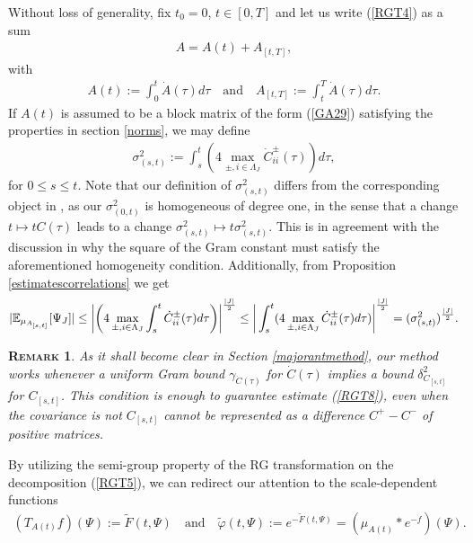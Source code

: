 \documentclass[12pt,twoside]{amsart}
\newcommand{\E}{{\mathbb{E}}}
\newtheorem{rem}{\textsc{Remark}}[section]
\numberwithin{equation}{section}
\begin{document}
Without loss of generality, fix $t_{0} = 0$, $t \in [0,T]$ and let us write (\ref{RGT4}) as a sum
\begin{eqnarray}
A = A(t) + A_{[t,T]}, \label{RGT5}
\end{eqnarray}
with
\begin{eqnarray}
A(t) := \int_{0}^{t}\dot{A}(\tau)d\tau \quad \mbox{and} \quad A_{[t,T]} := \int_{t}^{T}\dot{A}(\tau)d\tau. \label{RGT6}
\end{eqnarray}
If $A(t)$ is assumed to be a block matrix of the form (\ref{GA29}) satisfying the properties in section \ref{norms}, we may define
\begin{eqnarray}
\sigma_{(s,t)}^{2} := \int_{s}^{t}(4\max_{\pm, i \in \Lambda_{J}}\dot{C}_{ii}^{\pm}(\tau))d\tau, \label{RGT7}
\end{eqnarray}
for $0 \le s \le t$. Note that our definition of $\sigma_{(s,t)}^{2}$ differs from the corresponding object in \cite{BryWri}, as our $\sigma_{(0,t)}^{2}$ is homogeneous of degree one, in the sense that a change $t \mapsto t C(\tau)$ leads to a change $\sigma_{(s,t)}^{2} \mapsto t \sigma_{(s,t)}^{2}$. This is in agreement with the discussion in \cite{SW} why the square of the Gram constant must satisfy the aforementioned homogeneity condition. Additionally, from Proposition \ref{estimatescorrelations} we get
\begin{eqnarray}
|\E_{\mu_{A_{[s,t]}}}[\Psi_{J}]|  \le \bigg{|}\bigg{(}4\max_{\pm, i\in \Lambda_{J}}\int_{s}^{t}\dot{C}^{\pm}_{ii}(\tau)d\tau \bigg{)}\bigg{|}^{\frac{|J|}{2}} \le \bigg{|}\int_{s}^{t}(4\max_{\pm,i\in \Lambda_{J}}\dot{C}^{\pm}_{ii}(\tau)d\tau)\bigg{|}^{\frac{|J|}{2}} = (\sigma_{(s,t)}^{2})^{\frac{|J|}{2}}. \label{RGT8}
\end{eqnarray}

\begin{rem}\label{boundremark} As it shall become clear in Section \ref{majorantmethod}, our method works whenever a uniform Gram bound $\gamma_{\dot{C}(\tau)}$ for $\dot{C}(\tau)$ implies a bound $\delta_{C_{[s,t]}}^{2}$ for $C_{[s,t]}$. This condition is enough to guarantee estimate (\ref{RGT8}), even when the covariance is not $C_{[s,t]}$ cannot be represented as a difference $C^{+} - C^{-}$ of positive matrices. 

\end{rem}


By utilizing the semi-group property of the RG transformation on the decomposition (\ref{RGT5}), we can redirect our attention to the scale-dependent functions
\begin{eqnarray}
(T_{A(t)}f)(\Psi) := \tilde{F}(t,\Psi) \quad \mbox{and} \quad \tilde{\varphi}(t,\Psi) := e^{-\tilde{F}(t,\Psi)} =  (\mu_{A(t)}*e^{-f})(\Psi). \label{RGT9}
\end{eqnarray}
\end{document}
